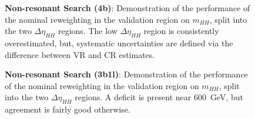 \begin{figure}[ht]
  \centering
  \caption{\label{fig:nonres-4b-VR} \textbf{Non-resonant Search (4b)}: Demonstration of the performance of the nominal reweighting in the validation region on $m_{HH}$, split into the two $\Delta\eta_{HH}$ regions. The low $\Delta\eta_{HH}$ region is consistently overestimated, but, systematic uncertainties are defined via the difference between 
  VR and CR estimates.}
\end{figure}

\begin{figure}[ht]
  \centering
  \caption{\label{fig:nonres-3b1l-VR} \textbf{Non-resonant Search (3b1l)}: Demonstration of the performance of the nominal reweighting in the validation region on $m_{HH}$, split into the two $\Delta\eta_{HH}$ regions. A deficit 
  is present near \SI{600}{\GeV}, but agreement is fairly good otherwise.}
\end{figure}


